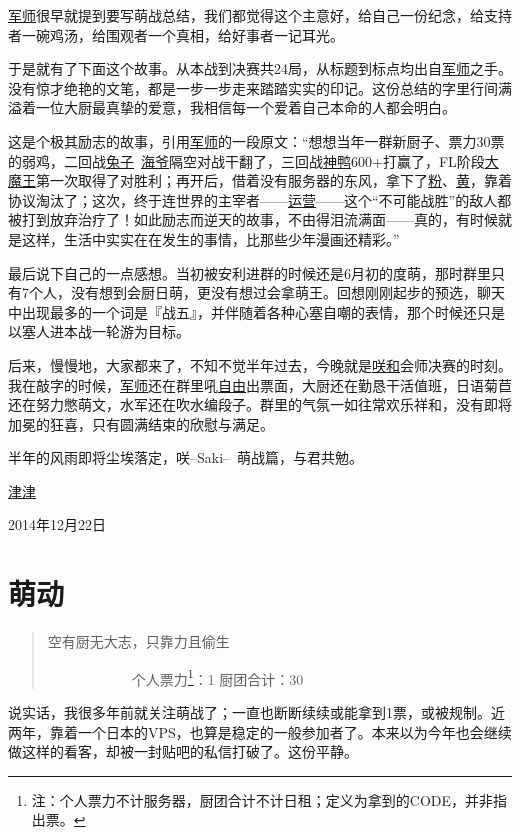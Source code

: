 \uline{军师}很早就提到要写萌战总结，我们都觉得这个主意好，给自己一份纪念，给支持者一碗鸡汤，给围观者一个真相，给好事者一记耳光。

于是就有了下面这个故事。从本战到决赛共24局，从标题到标点均出自\uline{军师}之手。没有惊才绝艳的文笔，都是一步一步走来踏踏实实的印记。这份总结的字里行间满溢着一位大厨最真挚的爱意，我相信每一个爱着自己本命的人都会明白。

这是个极其励志的故事，引用\uline{军师}的一段原文：“想想当年一群新厨子、票力30票的弱鸡，二回战\uline{兔子}~\uline{海爷}隔空对战干翻了，三回战\uline{神鸭}600+打赢了，FL阶段\uline{大魔王}第一次取得了对胜利；再开后，借着没有服务器的东风，拿下了\uline{粉}、\uline{黄}，靠着协议淘汰了；这次，终于连世界的主宰者——\uline{运营}——这个“不可能战胜”的敌人都被打到放弃治疗了！如此励志而逆天的故事，不由得泪流满面——真的，有时候就是这样，生活中实实在在发生的事情，比那些少年漫画还精彩。”

最后说下自己的一点感想。当初被安利进群的时候还是6月初的度萌，那时群里只有7个人，没有想到会厨日萌，更没有想过会拿萌王。回想刚刚起步的预选，聊天中出现最多的一个词是『战五』，并伴随着各种心塞自嘲的表情，那个时候还只是以塞人进本战一轮游为目标。

后来，慢慢地，大家都来了，不知不觉半年过去，今晚就是\uline{咲}\uline{和}会师决赛的时刻。我在敲字的时候，\uline{军师}还在群里吼\uline{自由}出票面，大厨还在勤恳干活值班，日语菊苣还在努力憋萌文，水军还在吹水编段子。群里的气氛一如往常欢乐祥和，没有即将加冕的狂喜，只有圆满结束的欣慰与满足。

半年的风雨即将尘埃落定，咲–Saki–~萌战篇，与君共勉。

\begin{flushright}
\kai \uline{津津}

2014年12月22日
\end{flushright}

\chapter{萌动}

\begin{quote}
空有厨无大志，只靠力且偷生

　　　　　　个人票力\footnote{注：个人票力不计服务器，厨团合计不计日租；定义为拿到的CODE，并非指出票。}：1 厨团合计：30
\end{quote}

说实话，我很多年前就关注萌战了；一直也断断续续或能拿到1票，或被规制。近两年，靠着一个日本的VPS，也算是稳定的一般参加者了。本来以为今年也会继续做这样的看客，却被一封贴吧的私信打破了。这份平静。

